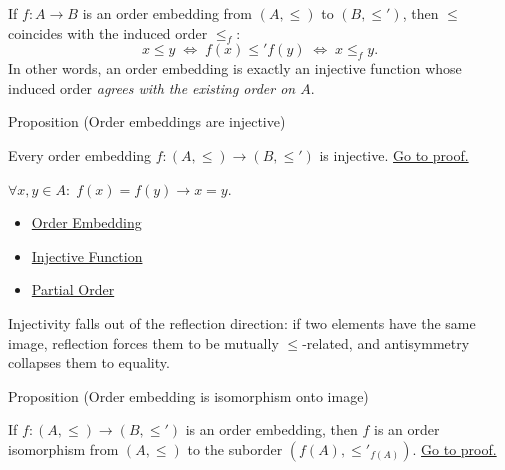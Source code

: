 \begin{remark*}
If $f : A \to B$ is an order embedding from $(A, \leq)$ to $(B, \leq')$,
then $\leq$ coincides with the induced order $\leq_f$:
\[
x \leq y \;\Longleftrightarrow\; f(x) \leq' f(y) \;\Longleftrightarrow\; x \leq_f y.
\]
In other words, an order embedding is exactly an injective function whose
induced order \emph{agrees with the existing order on $A$}.
\end{remark*}

\begin{propositionbox}{Proposition (Order embeddings are injective)}
\begin{proposition}\label{prop:embedding-injective}
Every order embedding $f : (A, \leq) \to (B, \leq')$ is injective.
\hyperref[prf:embedding-injective]{Go to proof.}
\end{proposition}
\end{propositionbox}

\begin{remark*}
$\forall x,y \in A:\; f(x) = f(y) \to x = y$.
\end{remark*}




\begin{dependencies}
\begin{itemize}
  \item \hyperref[def:order-embedding]{Order Embedding}
  \item \hyperref[def:injective]{Injective Function}
  \item \hyperref[def:partial-order]{Partial Order}
\end{itemize}
\end{dependencies}

\begin{remark*}
Injectivity falls out of the reflection direction: if two elements have the
same image, reflection forces them to be mutually $\leq$-related, and
antisymmetry collapses them to equality.
\end{remark*}

\begin{propositionbox}{Proposition (Order embedding is isomorphism onto image)}
\begin{proposition}\label{prop:embedding-iso}
If $f : (A, \leq) \to (B, \leq')$ is an order embedding, then $f$ is an
order isomorphism from $(A, \leq)$ to the suborder $(f(A), \leq'_{f(A)})$.
\hyperref[prf:embedding-iso]{Go to proof.}
\end{proposition}
\end{propositionbox}

